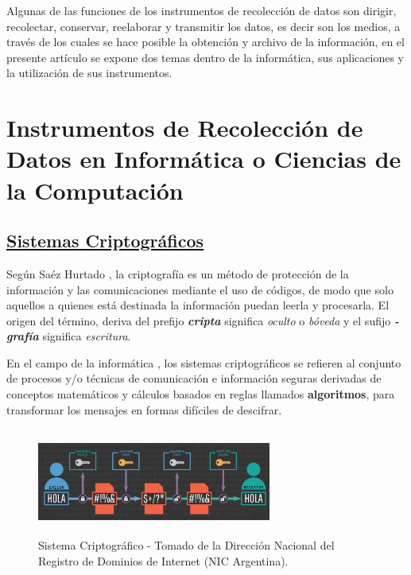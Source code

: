 \documentclass[10pt,journal]{IEEEtran}
\begin{document}
    Algunas de las funciones de los instrumentos de recolección de datos son dirigir, recolectar, conservar, reelaborar y transmitir los datos, es decir son los medios, a través de los cuales se hace posible la obtención y archivo de la información, en el presente artículo se expone dos temas dentro de la informática, sus aplicaciones y la utilización de sus instrumentos.  

    \section{\textbf{Instrumentos de Recolección de Datos en Informática o Ciencias de la Computación}}
    \subsection{\underline{\textbf{Sistemas Criptográficos}}}
    Según Saéz Hurtado \citep{cripto}, la criptografía es un método de protección de la información y las comunicaciones mediante el uso de códigos, de modo que solo aquellos a quienes está destinada la información puedan leerla y procesarla. El origen del término, deriva del prefijo \textbf{\textit{cripta}} significa \textit{oculto} o \textit{bóveda} y el sufijo \textbf{\textit{-grafía}} significa \textit{escritura}.

    En el campo de la informática \citep{marrero}, los sistemas criptográficos se refieren al conjunto de procesos y/o técnicas de comunicación e información seguras derivadas de conceptos matemáticos y cálculos basados en reglas llamados \textbf{algoritmos}, para transformar los mensajes en formas difíciles de descifrar.
    
    \begin{figure}[H]
      \begin{center}
        \includegraphics[width=7.7cm, height=3.5cm]{figuras/cripto.png}
        \caption{Sistema Criptográfico - Tomado de la Dirección Nacional del Registro de Dominios de Internet (NIC Argentina).}
        \label{cripto} 
        \end{center}
    \end{figure}
    
\end{document}
